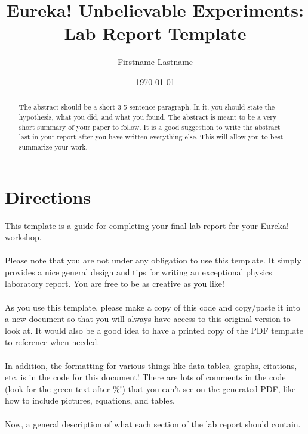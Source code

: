 \documentclass[12pt]{article}
\begin{document}
\title{Eureka! Unbelievable Experiments: Lab Report Template} %
\author{Firstname Lastname} %


\date{\today}  %

\maketitle  %



\begin{abstract} 
	The abstract should be a short 3-5 sentence paragraph. In it, you should state the hypothesis, what you did, and what you found. The abstract is meant to be a very short summary of your paper to follow. It is a good suggestion to write the abstract last in your report after you have written everything else. This will allow you to best summarize your work. 
\end{abstract}

\section{Directions}

    This template is a guide for completing your final lab report for your Eureka! workshop. 
    \\\\
    Please note that you are not under any obligation to use this template. It simply provides a nice general design and tips for writing an exceptional physics laboratory report. You are free to be as creative as you like!
    \\\\
    As you use this template, please make a copy of this code and copy/paste it into a new document so that you will always have access to this original version to look at. It would also be a good idea to have a printed copy of the PDF template to reference when needed. 
    \\\\
    In addition, the formatting for various things like data tables, graphs, citations, etc. is in the code for this document! There are lots of comments in the code (look for the green text after \%!) that you can't see on the generated PDF, like how to include pictures, equations, and tables. 
    \\\\
    Now, a general description of what each section of the lab report should contain.\\
    
\end{document}
